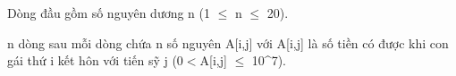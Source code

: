 Dòng đầu gồm số nguyên dương n (1  $\le$  n  $\le$  20).  

   n dòng sau mỗi dòng chứa n số nguyên A[i,j] với A[i,j] là số tiền có được khi con gái thứ i kết hôn với tiến sỹ j (0$<$A[i,j] $\le$ 10^7).  

\